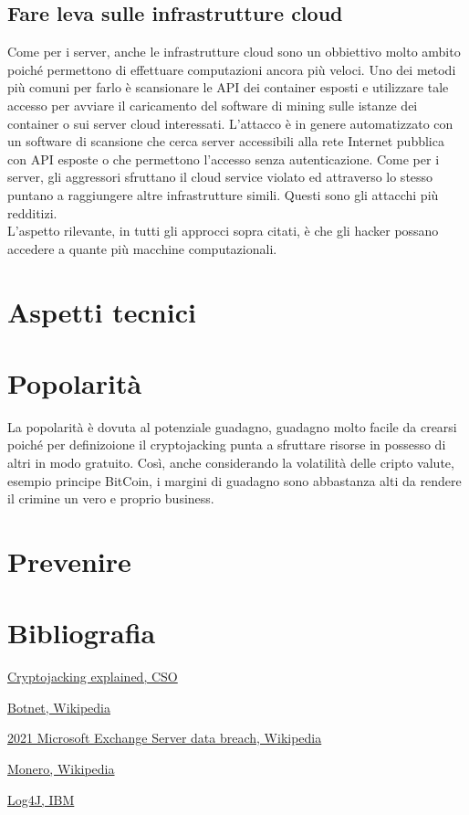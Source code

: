 \documentclass[12pt,a4paper]{article}
\begin{document}
\subsection{Fare leva sulle infrastrutture cloud}
Come per i server, anche le infrastrutture cloud sono un obbiettivo molto ambito
poiché permettono di effettuare computazioni ancora più veloci. Uno dei metodi
più comuni per farlo è scansionare le API dei container esposti e utilizzare
tale accesso per avviare il caricamento del software di mining sulle istanze dei
container o sui server cloud interessati. L'attacco è in genere automatizzato
con un software di scansione che cerca server accessibili alla rete Internet
pubblica con API esposte o che permettono l'accesso senza autenticazione. Come
per i server, gli aggressori sfruttano il cloud service violato ed attraverso lo
stesso puntano a raggiungere altre infrastrutture simili.
Questi sono gli attacchi più redditizi.
\\
L'aspetto rilevante, in tutti gli approcci sopra citati, è che gli hacker possano 
accedere a quante più macchine computazionali.

\section{Aspetti tecnici}

\section{Popolarità}
La popolarità è dovuta al potenziale guadagno, guadagno molto facile da crearsi
poiché per definizoione il cryptojacking punta a sfruttare risorse in possesso
di altri in modo gratuito. Così, anche considerando la volatilità delle cripto
valute, esempio principe BitCoin, i margini di guadagno sono abbastanza alti da rendere 
il crimine un vero e proprio business. 

\section{Prevenire}

\section{Bibliografia}
\begin{thebibliography}{9}

\href{https://arc.net/l/quote/karbftmg}{Cryptojacking explained, CSO}

\href{https://arc.net/l/quote/ftyxgxms}{Botnet, Wikipedia}

\href{https://arc.net/l/quote/golshtco}{2021 Microsoft Exchange Server data breach, Wikipedia}

\href{https://arc.net/l/quote/jffmkeln}{Monero, Wikipedia}

\href{https://arc.net/l/quote/zjujxamu}{Log4J, IBM}


\end{thebibliography}
\end{document}
